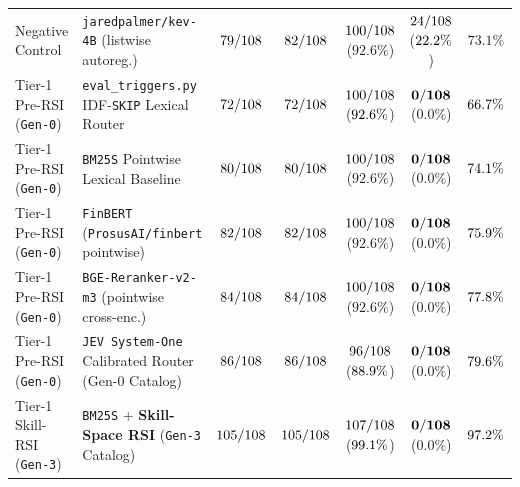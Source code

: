 \begin{table}[t]
{\begin{tabular}{@{}llccccc@{}}
Negative Control & \texttt{jaredpalmer/kev-4B} (listwise autoreg.) & $79/108$ & $82/108$ & $100/108$ ($92.6\%$) & $24/108$ ($22.2\%$) & $73.1\%$ \\
Tier-1 Pre-RSI (\texttt{Gen-0}) & \texttt{eval\_triggers.py} IDF-\texttt{SKIP} Lexical Router & $72/108$ & $72/108$ & $100/108$ ($92.6\%$) & $\mathbf{0/108}$ ($\mathbf{0.0\%}$) & $66.7\%$ \\
Tier-1 Pre-RSI (\texttt{Gen-0}) & \texttt{BM25S} Pointwise Lexical Baseline & $80/108$ & $80/108$ & $100/108$ ($92.6\%$) & $\mathbf{0/108}$ ($\mathbf{0.0\%}$) & $74.1\%$ \\
Tier-1 Pre-RSI (\texttt{Gen-0}) & \texttt{FinBERT} (\texttt{ProsusAI/finbert} pointwise) & $82/108$ & $82/108$ & $100/108$ ($92.6\%$) & $\mathbf{0/108}$ ($\mathbf{0.0\%}$) & $75.9\%$ \\
Tier-1 Pre-RSI (\texttt{Gen-0}) & \texttt{BGE-Reranker-v2-m3} (pointwise cross-enc.) & $84/108$ & $84/108$ & $100/108$ ($92.6\%$) & $\mathbf{0/108}$ ($\mathbf{0.0\%}$) & $77.8\%$ \\
Tier-1 Pre-RSI (\texttt{Gen-0}) & \texttt{JEV System-One} Calibrated Router (Gen-0 Catalog) & $86/108$ & $86/108$ & $96/108$ ($88.9\%$) & $\mathbf{0/108}$ ($\mathbf{0.0\%}$) & $79.6\%$ \\
Tier-1 Skill-RSI (\texttt{Gen-3}) & \texttt{BM25S} + \textbf{Skill-Space RSI} (\texttt{Gen-3} Catalog) & $105/108$ & $105/108$ & $107/108$ ($99.1\%$) & $\mathbf{0/108}$ ($\mathbf{0.0\%}$) & $97.2\%$ \\

\end{tabular}}
\end{table}
